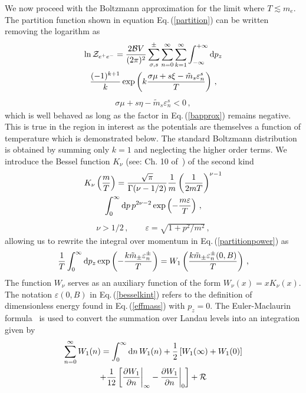 \documentclass[reprint]{revtex4-2}
\newcommand{\req}[1]{Eq.\,(\ref{#1})}
\begin{document}
We now proceed with the Boltzmann approximation for the limit where $T\lesssim m_e$. The partition function shown in equation \req{partition} can be written removing the logarithm as
\begin{multline}
    \label{partitionpower}
    \ln{{\cal Z}_{e^{+}e^{-}}}=\frac{2{\cal B}V}{(2\pi)^{2}}\sum_{\sigma,s}^{\pm}\sum_{n=0}^{\infty}\sum_{k=1}^{\infty}\int_{-\infty}^{+\infty}{\rm d}p_{z}\\
    \frac{(-1)^{k+1}}{k}\exp\left({k\frac{\sigma\mu+s\xi-{\tilde m}_{s}\varepsilon^{s}_{n}}{T}}\right)\,,
\end{multline}
\begin{align}
   \label{bapprox} 
   \sigma\mu+s\eta-{\tilde m}_{s}\varepsilon_{n}^{s}<0\,,
\end{align}
which is well behaved as long as the factor in \req{bapprox} remains negative. This is true in the region in interest as the potentials are themselves a function of temperature which is demonstrated below. The standard Boltzmann distribution is obtained by summing only $k=1$ and neglecting the higher order terms. We introduce the Bessel function $K_{\nu}$ (see: Ch. 10 of~\cite{letessier2002hadrons}) of the second kind
\begin{multline}
    \label{besselk}
    K_{\nu}\left(\frac{m}{T}\right)=\frac{\sqrt{\pi}}{\Gamma(\nu-1/2)}\frac{1}{m}\left(\frac{1}{2mT}\right)^{\nu-1}\\
    \int_{0}^{\infty}{\rm d}p\,p^{2\nu-2}\exp\left({-\frac{m\varepsilon}{T}}\right)\,,
\end{multline}
\begin{align}
   \nu>1/2\,,\qquad\varepsilon=\sqrt{1+p^{2}/m^{2}}\,,
\end{align}
allowing us to rewrite the integral over momentum in \req{partitionpower} as
\begin{align}
    \label{besselkint}
    \frac{1}{T}\int_{0}^{\infty}{\rm d}p_{z}\exp\left({-\frac{k{\tilde m}_{\pm}\varepsilon_{n}^{\pm}}{T}}\right)=W_{1}\left(\frac{k{\tilde m}_{\pm}\varepsilon_{n}^{\pm}(0,B)}{T}\right)\,,
\end{align}
The function $W_{\nu}$ serves as an auxiliary function of the form $W_{\nu}(x)=xK_{\nu}(x)$. The notation $\varepsilon(0,B)$ in \req{besselkint} refers to the definition of dimensionless energy found in \req{effmass} with $p_{z}=0$. The Euler-Maclaurin formula~\cite{abramowitz1988handbook} is used to convert the summation over Landau levels into an integration given by
\begin{multline}
    \label{eulermaclaurin}
    \sum_{n=0}^{\infty}W_{1}(n)=\int_{0}^{\infty}{\rm d}n\,W_{1}(n)+\frac{1}{2}\left[W_{1}(\infty)+W_{1}(0)\right]\\
    +\frac{1}{12}\left[\frac{\partial W_{1}}{\partial n}\bigg\vert_{\infty}-\frac{\partial W_{1}}{\partial n}\bigg\vert_{0}\right]+{\cal R}
\end{multline}
\end{document}
